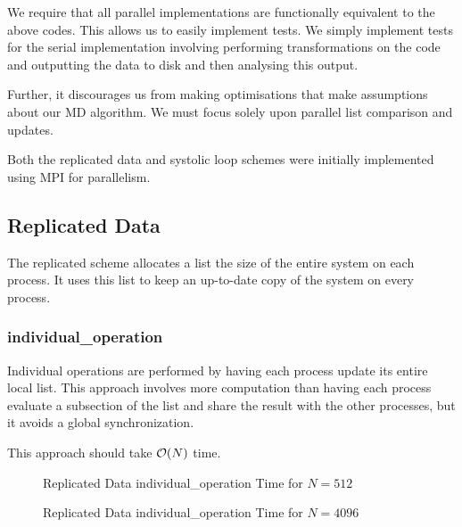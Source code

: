 We require that all parallel implementations are functionally equivalent
to the above codes.
%
This allows us to easily implement tests.
%
We simply implement tests for the serial implementation involving
performing transformations on the code and outputting the data to disk
and then analysing this output.

Further, it discourages us from making optimisations that make
assumptions about our MD algorithm.
%
We must focus solely upon parallel list comparison and updates.

Both the replicated data and systolic loop schemes were initially implemented
using MPI for parallelism.



\subsection{Replicated Data}

The replicated scheme allocates a list the size of the entire system
on each process.
%
It uses this list to keep an up-to-date copy of the system on every
process.


%
%

\subsubsection{individual\_operation}

Individual operations are performed by having each process update
its entire local list.
This approach involves more computation than having each process
evaluate a subsection of the list and share the result with the
other processes, but it avoids a global synchronization.

This approach should take $\mathcal{O}{(N)}$ time.

\begin{figure}
    
    \caption{Replicated Data individual\_operation Time for $N = 512$}
    \label{fig:v0_replicated_individual_operation_512_time}
\end  {figure}

\begin{figure}
    
    \caption{Replicated Data individual\_operation Time for $N = 4096$}
    \label{fig:v0_replicated_individual_operation_4096_time}
\end  {figure}

